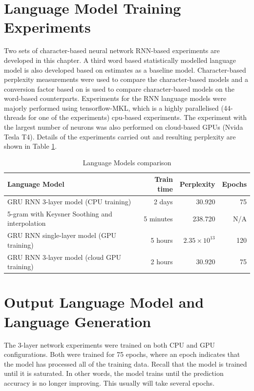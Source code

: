 \section{Language Model Training Experiments}
Two sets of character-based neural network RNN-based experiments are developed in this chapter.  A third word based statistically modelled language model is also developed based on  \cite{Heafield-estimate} estimates as a baseline model. Character-based perplexity measurements were used to compare the character-based models and a conversion factor based on \citep{hwang2017character} is used to compare character-based models on the word-based counterparts.  Experiments for the RNN language models were majorly performed using tensorflow-MKL, which is a highly parallelised (44-threads for one of the experiments) cpu-based experiments.  The experiment with the largest number of neurons was also performed on cloud-based GPUs (Nvida Tesla T4).  Details of the experiments carried out and resulting perplexity are shown in Table \ref{tab6_1:LMX}.

\begin{table}
  \caption{Language Models comparison}
  \label{tab6_1:LMX}
\begin{tabular}{lrrr}
\toprule
Language Model & Train time & Perplexity & Epochs  \\
\midrule
GRU RNN 3-layer model (CPU training) & ~ 2 days & 30.920 & 75 \\
5-gram with Keysner Soothing and interpolation & 5 minutes & 238.720 & N/A \\
GRU RNN single-layer model (GPU training) & ~ 5 hours & $2.35\times10^{13}$ & 120 \\
GRU RNN 3-layer model (cloud GPU training) & ~ 2 hours & 30.920 & 75 \\
\bottomrule
\end{tabular}
\end{table}

\stopblue


\section{Output Language Model and Language Generation}
\startblue
The 3-layer network experiments were trained on both CPU and GPU configurations. Both were trained for 75 epochs, where an epoch indicates that the model has processed all of the training data.  Recall that the model  is trained until it is saturated.  In other words, the model trains until the prediction accuracy is no longer improving.   This usually will take several epochs.

